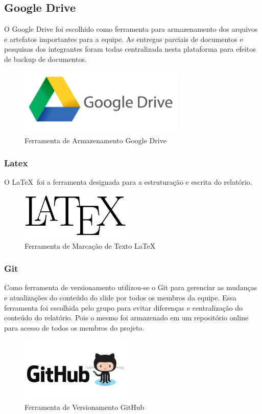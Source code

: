 \subsection{Google Drive}
O Google Drive foi escolhido como ferramenta para armazenamento dos arquivos e artefatos importantes para a
equipe. As entregas parciais de documentos e pesquisas dos integrantes foram todas centralizada nesta plataforma
para efeitos de backup de documentos.
\begin{figure}[h]
  \centering
  \includegraphics[width=300px, scale=0.5]{figuras/google_drive-logo}
  \caption{Ferramenta de Armazenamento Google Drive}
  \label{table:google_drive-logo}
\end{figure}
\subsubsection{Latex}
O \LaTeX\ foi a ferramenta designada para a estruturação e escrita do relatório.
\begin{figure}[h]
  \centering
  \includegraphics[width=200px, scale=0.5]{figuras/latex_logo}
  \caption{Ferramenta de Marcação de Texto LaTeX}
  \label{table:latex_logo}
\end{figure}
\subsubsection{Git}
Como ferramenta de versionamento utilizou-se o Git para gerenciar as mudanças e atualizações do conteúdo do slide
por todos os membros da equipe. Essa ferramenta foi escolhida pelo grupo para evitar diferenças e centralização do
conteúdo do relatório. Pois o mesmo foi armazenado em um repositório online para acesso de todos os membros do projeto.
\begin{figure}[h]
  \centering
  \includegraphics[width=200px, scale=0.5]{figuras/git}
  \caption{Ferramenta de Versionamento GitHub}
  \label{table:git}
\end{figure}
